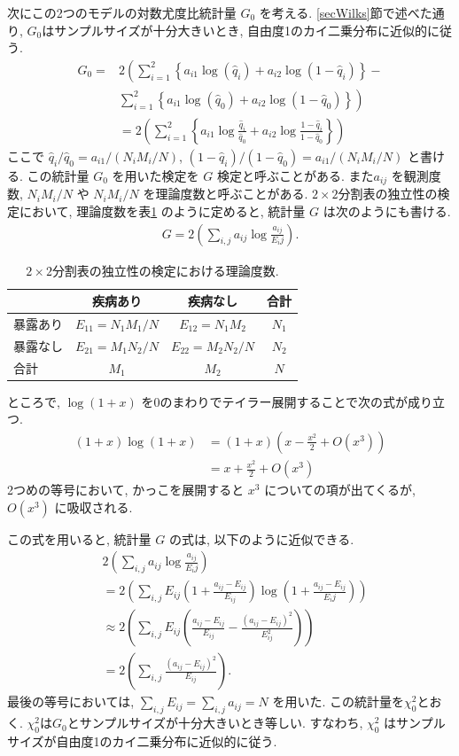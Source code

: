 \documentclass[a4paper, 12pt]{jarticle}
\begin{document}
次にこの2つのモデルの対数尤度比統計量 $G_0$ を考える.
\ref{secWilks}節で述べた通り, $G_0$はサンプルサイズが十分大きいとき, 自由度1のカイ二乗分布に近似的に従う. 
\begin{align}
G_0 =& 2 \left(\sum_{i=1}^2 \left\{ a_{i1}\log(\hat q_i)+ a_{i2}\log(1-\hat q_i)\right\} -\right. \\
&\left.\sum_{i=1}^2 \left\{ a_{i1}\log(\hat q_0) + a_{i2}\log(1-\hat q_0)\right\}\right)\\
&= 2 \left(\sum_{i=1}^2\left\{ a_{i1}\log\frac{\hat q_i}{\hat q_0} + a_{i2}\log\frac{1-\hat q_i}{1-\hat q_0}\right\}\right)
\end{align}
ここで $\hat q_i/\hat q_0 = a_{i1}/(N_iM_i/N)$,  $(1-\hat q_i)/(1-\hat q_0) = a_{i1}/(N_iM_i/N)$ と書ける.
この統計量 $G_0$ を用いた検定を $G$ 検定と呼ぶことがある.
また$a_{ij}$ を観測度数, $N_iM_i/N$ や $N_iM_i/N$ を理論度数と呼ぶことがある.
$2 \times 2$分割表の独立性の検定において, 理論度数を表\ref{2by2theo} のように定めると, 統計量 $G$ は次のようにも書ける.
\begin{align}
G = 2 \left(\sum_{i,j} a_{ij}\log\frac{a_{ij}}{E_ij} \right).
\end{align}
\begin{table}[htbp]
\centering
\caption{$2 \times 2$分割表の独立性の検定における理論度数.}
\label{2by2theo}
\begin{tabular}{l|cc|c}
 & 疾病あり&疾病なし&合計\\
 \hline
 暴露あり&$E_{11} = N_1M_1/N$&$E_{12} = N_1M_2$&$N_1$\\
 暴露なし&$E_{21} = M_1N_2/N $&$E_{22}=M_2N_2/N$&$N_2$\\
  \hline
 合計 & $M_1$ & $M_2$ & $N$
\end{tabular}
\end{table}

ところで, $\log (1+x)$ を0のまわりでテイラー展開することで次の式が成り立つ. 
\begin{align}
(1+x) \log (1+x) &= (1+x)\left(x-\frac{x^2}{2} + O(x^3)\right) \\
& = x + \frac{x^2}{2} +  O(x^3)
\end{align}
2つめの等号において, かっこを展開すると $x^3$ についての項が出てくるが, $O(x^3)$ に吸収される.

この式を用いると, 統計量 $G$ の式は, 以下のように近似できる.
\begin{align}
&2 \left(\sum_{i,j} a_{ij}\log\frac{a_{ij}}{E_ij} \right)\\
&=2 \left(\sum_{i,j} E_{ij} \left(1+ \frac{a_{ij}-E_{ij}}{E_{ij}}\right)\log\left(1+ \frac{a_{ij}-E_{ij}}{E_ij} \right)\right)\\
&\approx 2 \left(\sum_{i,j} E_{ij}\left(  \frac{a_{ij}-E_{ij}}{E_{ij}}- \frac{(a_{ij}-E_{ij})^2}{E_{ij}^2} \right)\right) \\
&= 2 \left(\sum_{i,j} \frac{(a_{ij}-E_{ij})^2}{E_{ij}} \right).
\end{align}
最後の等号においては, $\sum_{i,j} E_{ij} =\sum_{i,j} a_{ij} = N$ を用いた.
この統計量を$\chi^2_0$とおく. 
$\chi^2_0$は$G_0$とサンプルサイズが十分大きいとき等しい.
すなわち, $\chi^2_0$ はサンプルサイズが自由度1のカイ二乗分布に近似的に従う.
\end{document}
